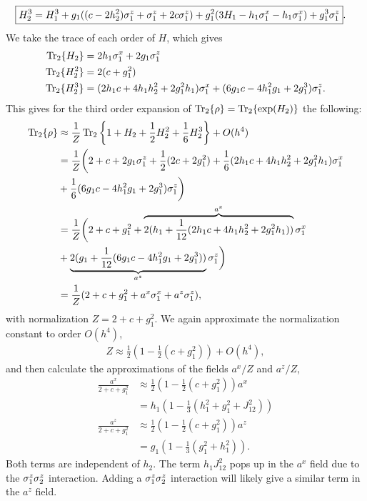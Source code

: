 \begin{align*}
    \Aboxed{H_2^3 & = H_1^3 + g_1((c - 2h_2^2) {\sz_1} + {\sz_1} + 2c {\sz_1})  + g_1^2(3H_1 - h_1 {\sx_1} - h_1{\sx_1}) + g_1^3 {\sz_1}}.
\end{align*}
We take the trace of each order of $H$, which gives
\begin{align*}
    \Tr_2\{H_2\} & = 2 h_1 {\sigma^{x}_1} + 2g_1 {\sigma^{z}_1}\\
    \Tr_2\{H_2^2\} & = 2(c + g_1^2)\\
    \Tr_2\{H_2^3\} & = (2h_1 c + 4 h_1 h_2^2 + 2g_1^2 h_1) {\sigma^{x}_1} + (6g_1c - 4h_1^2 g_1 + 2g_1^3) {\sigma^{z}_1}.
\end{align*}
This gives for the third order expansion of $\Tr_2\{\rho\} = \Tr_2\{\exp(H_2)\}$ the following:
\begin{align*}
    \Tr_2\{\rho\}  & \approx \frac{1}{Z}\Tr_2\left\{ 1 + H_2 + \frac{1}{2}H_2^2 +  \frac{1}{6}H_2^3\right \} + O(h^4) \\
    & = \frac{1}{Z} \bigg(2 + c + 2g_1 {\sigma^{z}_1} + \frac{1}{2}(2c + 2g_1^2) + \frac{1}{6}(2h_1 c + 4 h_1 h_2^2 + 2g_1^2 h_1) {\sigma^{x}_1} \\
    & + \frac{1}{6}(6g_1c - 4h_1^2 g_1 + 2g_1^3) {\sigma^{z}_1}\bigg) \\
    & = \frac{1}{Z} \bigg(2 + c + g_1^2 + \overbrace{2(h_1 + \frac{1}{12}(2h_1 c + 4h_1 h_2^2+2g_1^2 h_1))}^{a^x}{\sigma^{x}_1}\\
    & + \underbrace{2(g_1 + \frac{1}{12}(6g_1c - 4h_1^2 g_1 + 2g_1^3))}_{a^z} {\sigma^{z}_1}\bigg) \\
    & = \frac{1}{Z}(2+ c + g_1^2 + a^x {\sigma^{x}_1} + a^z{\sigma^{z}_1}),
\end{align*}
with normalization $Z = 2+c+g_1^2$. We again approximate the normalization constant to order $O(h^4)$,
\begin{align*}
    Z \approx \frac{1}{2}(1 - \frac{1}{2}(c+g_1^2)) + O(h^4),
\end{align*}
and then calculate the approximations of the fields $a^x/Z$ and $a^z/Z$,
\begin{align}
    \frac{a^x}{2+ c + g_1^2} & \approx \frac{1}{2}(1 - \frac{1}{2}(c+g_1^2)) a^x  \nonumber\\
    & = h_1(1 - \frac{1}{3} \left(h_1^2 + g_1^2  + J_{12}^2 \right)) \label{eq:h2_tr_3rd_x}\\
    \frac{a^z}{2+ c + g_1^2} & \approx \frac{1}{2}(1 - \frac{1}{2}(c+g_1^2)) a^z  \nonumber\\
    & = g_1( 1 - \frac{1}{3} \left(g_1^2 + h_1^2\right))\label{eq:h2_tr_3rd_z}.
\end{align}
Both terms are independent of $h_2$. The term $h_1 J_{12}^2$ pops up in the $a^x$ field due to the ${\sigma^{z}_1}{\sigma^{z}_2}$ interaction. Adding a ${\sigma^{z}_1}{\sigma^{z}_2}$ interaction will likely give a similar term in the $a^z$ field.